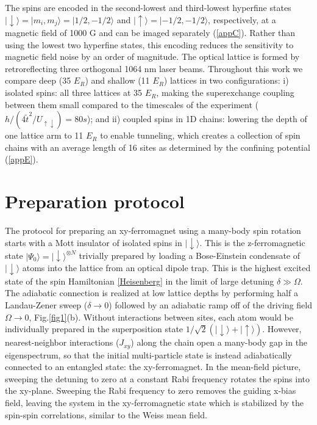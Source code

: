 \documentclass[12pt]{iopart}
\begin{document}
The spins are encoded in the second-lowest and third-lowest hyperfine states $|{\downarrow}\rangle = |{m_i,m_j }\rangle = |{1/2,-1/2 }\rangle$ and $|{\uparrow}\rangle = |{-1/2,-1/2}\rangle$, respectively, at a magnetic field of 1000 G and can be imaged separately (\ref{appC}). Rather than using the lowest two hyperfine states, this encoding reduces the sensitivity to magnetic field noise by an order of magnitude. The optical lattice is formed by retroreflecting three orthogonal 1064 nm laser beams. Throughout this work we compare deep (35 $E_R$) and shallow (11 $E_R$) lattices in two configurations: i) isolated spins: all three lattices at 35 $E_R$, making the superexchange coupling between them small compared to the timescales of the experiment ($h/(4 \tilde{t}^2/U_{\uparrow\downarrow}) = 80 s$); and ii) coupled spins in 1D chains: lowering the depth of one lattice arm to 11 $E_R$ to enable tunneling, which creates a collection of spin chains with an average length of 16 sites as determined by the confining potential (\ref{appE}). 

\section{Preparation protocol}
The protocol for preparing an xy-ferromagnet using a many-body spin rotation starts with a Mott insulator of isolated spins in $|{\downarrow}\rangle$. This is the z-ferromagnetic state $|\Psi_0\rangle =|{\downarrow}\rangle^{\otimes N}$ trivially prepared by loading a Bose-Einstein condensate of $|{\downarrow} \rangle$ atoms into the lattice from an optical dipole trap. This is the highest excited state of the spin Hamiltonian \ref{Heisenberg} in the limit of large detuning $\delta \gg \Omega$. The adiabatic connection is realized at low lattice depths by performing half a Landau-Zener sweep ($\delta \rightarrow 0$) followed by an adiabatic ramp off of the driving field $\Omega \rightarrow 0$, Fig.\ref{fig1}(b). Without interactions between sites, each atom would be individually prepared in the superposition state $1/\sqrt{2} \left(|{\downarrow}\rangle + |{\uparrow}\rangle \right)$. However, nearest-neighbor interactions ($J_{xy}$) along the chain open a many-body gap in the eigenspectrum, so that the initial multi-particle state is instead adiabatically connected to an entangled state: the xy-ferromagnet. In the mean-field picture, sweeping the detuning to zero at a constant Rabi frequency rotates the spins into the xy-plane. Sweeping the Rabi frequency to zero removes the guiding x-bias field, leaving the system in the xy-ferromagnetic state which is stabilized by the spin-spin correlations, similar to the Weiss mean field. 
\end{document}
